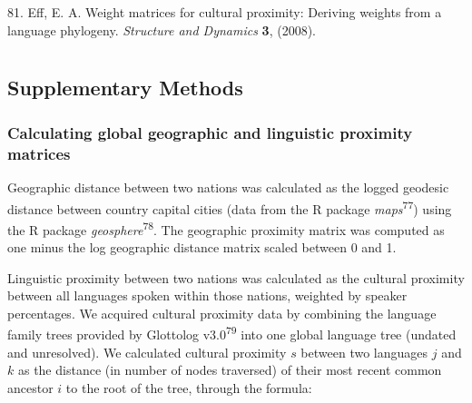 \documentclass[english,man,floatsintext]{apa6}
\begin{document}
\leavevmode\hypertarget{ref-Eff2008}{}%
81. Eff, E. A. Weight matrices for cultural proximity: Deriving weights from a language phylogeny. \emph{Structure and Dynamics} \textbf{3}, (2008).

\endgroup

\newpage

\hypertarget{appendix-appendix}{%
\appendix}


\renewcommand{\appendixname}{\bf{Supplementary Material}}
\renewcommand{\figurename}{Supplementary Figure}
\renewcommand{\tablename}{Supplementary Table}
\renewcommand{\thefigure}{S\arabic{figure}} \setcounter{figure}{0}
\renewcommand{\thetable}{S\arabic{table}} \setcounter{table}{0}
\renewcommand{\theequation}{S\arabic{table}} \setcounter{equation}{0}

\hypertarget{section}{%
\section{}\label{section}}

\hypertarget{supplementary-methods}{%
\subsection{Supplementary Methods}\label{supplementary-methods}}

\hypertarget{calculating-global-geographic-and-linguistic-proximity-matrices}{%
\subsubsection{Calculating global geographic and linguistic proximity matrices}\label{calculating-global-geographic-and-linguistic-proximity-matrices}}

Geographic distance between two nations was calculated as the logged geodesic distance between country capital cities (data from the R package \emph{maps}\textsuperscript{77}) using the R package \emph{geosphere}\textsuperscript{78}. The geographic proximity matrix was computed as one minus the log geographic distance matrix scaled between 0 and 1.

Linguistic proximity between two nations was calculated as the cultural proximity between all languages spoken within those nations, weighted by speaker percentages. We acquired cultural proximity data by combining the language family trees provided by Glottolog v3.0\textsuperscript{79} into one global language tree (undated and unresolved). We calculated cultural proximity \(s\) between two languages \(j\) and \(k\) as the distance (in number of nodes traversed) of their most recent common ancestor \(i\) to the root of the tree, through the formula:
\end{document}
